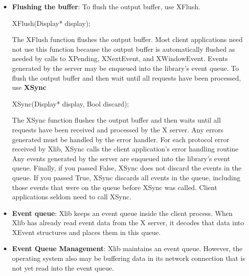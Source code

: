 \documentclass{report}
\begin{document}
\begin{itemize}
            \bigbreak \noindent 
            Xlib does not necessarily send every request immediately. Calls usually just append protocol requests into Xlib’s output buffer. They may not reach the X server until Xlib decides to flush the buffer.
            \bigbreak \noindent 
            The output buffer exists because sending every request with a separate system call would be inefficient. Xlib batches requests together and writes them in larger chunks.
        \item \textbf{Flushing the buffer}: To flush the output buffer, use XFlush.
            \bigbreak \noindent 
            \begin{cppcode}
            XFlush(Display* display);
            \end{cppcode}
            \bigbreak \noindent 
            The XFlush function flushes the output buffer. Most client applications need not use this function because the output buffer is automatically flushed as needed by calls to XPending, XNextEvent, and XWindowEvent. Events generated by the server may be enqueued into the library’s event queue.
            \bigbreak \noindent 
            To flush the output buffer and then wait until all requests have been processed, use \textbf{XSync}
            \bigbreak \noindent 
            \begin{cppcode}
            XSync(Display* display, Bool discard);
            \end{cppcode}
            \bigbreak \noindent 
            The XSync function flushes the output buffer and then waits until all requests have been received and processed by the X server. Any errors generated must be handled by the error handler. For each protocol error received by Xlib, XSync calls the client application’s error handling routine
            \bigbreak \noindent 
            Any events generated by the server are enqueued into the library’s event queue.
            \bigbreak \noindent 
            Finally, if you passed False, XSync does not discard the events in the queue. If you passed True, XSync discards all events in the queue, including those events that were on the queue before XSync was called. Client applications seldom need to call XSync.
        \item \textbf{Event queue}: Xlib keeps an event queue inside the client process. When Xlib has already read event data from the X server, it decodes that data into XEvent structures and places them in this queue.
        \item \textbf{Event Queue Management}: Xlib maintains an event queue. However, the operating system also may be buffering data in its network connection that is not yet read into the event queue.

\end{itemize}
\end{document}
